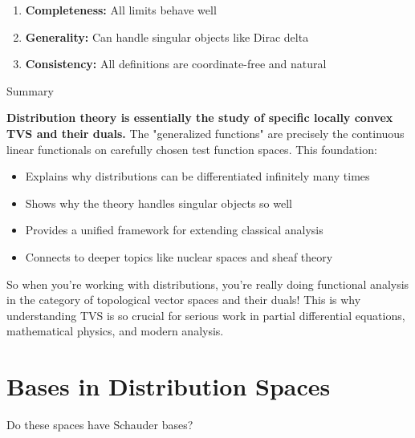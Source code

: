 \documentclass[aps,preprint]{revtex4}
\newenvironment{question}
  {\begin{tcolorbox}[colback=blue!5!white,colframe=blue!75!black,title=Question]}
  {\end{tcolorbox}}
\newenvironment{answer}
  {\begin{tcolorbox}[colback=green!5!white,colframe=green!75!black,title=Answer]}
  {\end{tcolorbox}}
\begin{document}
\begin{answer}
\begin{enumerate}
\item \textbf{Completeness:} All limits behave well

\item \textbf{Generality:} Can handle singular objects like Dirac delta

\item \textbf{Consistency:} All definitions are coordinate-free and natural
\end{enumerate}

Summary

\textbf{Distribution theory is essentially the study of specific locally
convex TVS and their duals.} The "generalized functions" are precisely the
continuous linear functionals on carefully chosen test function spaces. This
foundation:

\begin{itemize}
\item Explains why distributions can be differentiated infinitely many times

\item Shows why the theory handles singular objects so well

\item Provides a unified framework for extending classical analysis

\item Connects to deeper topics like nuclear spaces and sheaf theory
\end{itemize}

So when you're working with distributions, you're really doing functional
analysis in the category of topological vector spaces and their duals! This
is why understanding TVS is so crucial for serious work in partial
differential equations, mathematical physics, and modern analysis.
\end{answer}

\section{Bases in Distribution Spaces}

\begin{question}
Do these spaces have Schauder bases?
\end{question}
\end{document}
